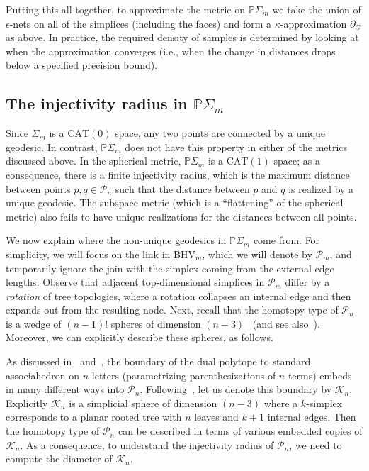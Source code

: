\documentclass[a4paper,11pt]{article}
\newcommand{\CAT}{\textrm{CAT}}
\newcommand{\BHV}{\textrm{BHV}}
\newcommand{\aK}{\mathcal{K}}
\newcommand{\aP}{\mathcal{P}}
\begin{document}
Putting this all together, to approximate the metric on $\mathbb{P}\Sigma_m$ we take the union of $\epsilon$-nets on all of the simplices (including the faces) and form a $\kappa$-approximation $\partial_G$ as above.
In practice, the required density of samples is determined by looking at when the approximation converges (i.e., when the change in distances drops below a specified precision bound).

\subsection{The injectivity radius in $\mathbb{P}\Sigma_m$}

Since $\Sigma_m$ is a $\CAT(0)$ space, any two points are connected by a unique geodesic.
In contrast, $\mathbb{P}\Sigma_m$ does not have this property in either of the metrics discussed above.
In the spherical metric, $\mathbb{P}\Sigma_m$ is a $\CAT(1)$ space; as a consequence, there is a finite injectivity radius, which is the maximum distance between points $p,q \in \aP_n$ such that the distance between $p$ and $q$ is realized by a unique geodesic.
The subspace metric (which is a ``flattening'' of the spherical metric) also fails to have unique realizations for the distances between all points.

We now explain where the non-unique geodesics in $\mathbb{P}\Sigma_m$ come from.
For simplicity, we will focus on the link in $\BHV_m$, which we will denote by $\aP_m$, and temporarily ignore the join with the simplex coming from the external edge lengths.
Observe that adjacent top-dimensional simplices in $\aP_m$ differ by a {\em rotation} of tree topologies, where a rotation collapses an internal edge and then expands out from the resulting node.
Next, recall that the homotopy type of $\aP_n$ is a wedge of $(n-1)!$ spheres of dimension $(n-3)$~\cite{robinson1996tree} (and see also~\cite[Thm. 6]{devadoss2014polyhedral}).
Moreover, we can explicitly describe these spheres, as follows.

As discussed in~\cite[Prop. 1]{devadoss2014polyhedral} and~\cite[\S 3.1]{billera2001geometry}, the boundary of the dual polytope to standard associahedron on $n$ letters (parametrizing parenthesizations of $n$ terms) embeds in many different ways into $\aP_n$.
Following~\cite{devadoss2014polyhedral}, let us denote this boundary by $\aK_n$.
Explicitly $\aK_n$ is a simplicial sphere of dimension $(n-3)$ where a $k$-simplex corresponds to a planar rooted tree with $n$ leaves and $k+1$ internal edges.
Then the homotopy type of $\aP_n$ can be described in terms of various embedded copies of $\aK_n$.
As a consequence, to understand the injectivity radius of $\aP_n$, we need to compute the diameter of $\aK_n$.
\end{document}
